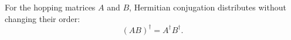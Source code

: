 \documentclass{article}
\begin{document}
For the hopping matrices $A$ and $B$, Hermitian conjugation distributes
without changing their order:
\begin{equation}
(A B)^\dagger = A^\dagger B^\dagger .
\label{eq:adjoint-order}
\end{equation}
\end{document}
